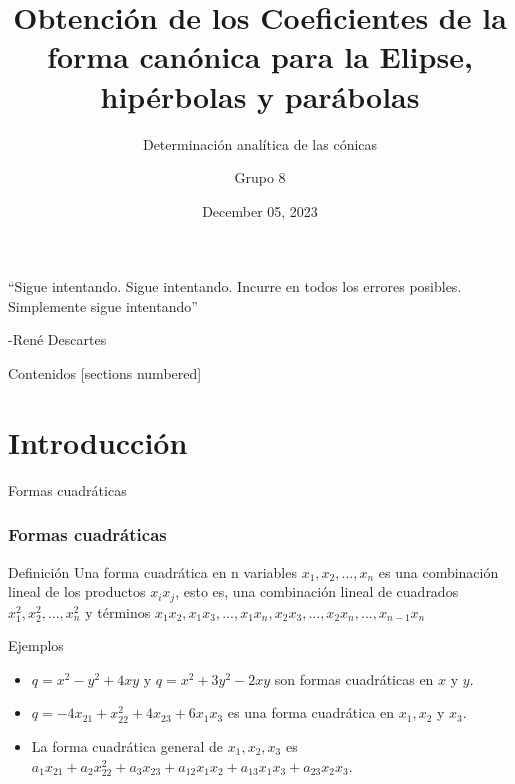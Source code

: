 \documentclass[xcolor={dvipsnames},aspectratio=169,10pt]{beamer}
\begin{document}
\title{Obtención de los Coeficientes de la forma canónica para la Elipse, hipérbolas y parábolas}
\subtitle{Determinación analítica de las cónicas}
\author{Grupo 8}
\date{December 05, 2023}

\maketitle%

\begin{frame}
\epigraph{``Sigue intentando. Sigue intentando. Incurre en todos los errores posibles. Simplemente sigue intentando''}{-René Descartes}
\end{frame}

\begin{frame}{Contenidos}
  [sections numbered]
  \tableofcontents[hideallsubsections]
\end{frame}

\section{Introducción}

\begin{frame}{Formas cuadráticas}
    \frametitle{Formas cuadráticas}
    \begin{block}{Definición}
      Una forma cuadrática en n variables $x_{1}, x_{2}, . . . , x_{n}$ es una combinación lineal de los
      productos $x_{i} x_{j}$, esto es, una combinación lineal de cuadrados $x_{1}^2 , x_{2}^2 , . . . , x_{n}^2$ y
      términos $x_{1}x_{2}, x_{1}x_{3}, . . . , x_{1}x_{n}, x_{2}x_{3}, . . . , x_{2}x_{n}, . . . , x_{n-1}x_{n}$
    \end{block}

  \begin{block}{Ejemplos}
    \begin{itemize}
        \item $q = x^2 - y^2 + 4xy$ y $q = x^2 + 3y^2 - 2xy$ son formas cuadráticas en $x$ y $y$.
        \item $q = -4x_{21} + x_{22}^2 + 4x_{23} + 6x_{1}x_{3}$ es una forma cuadrática en $x_{1}, x_{2}$ y $x_{3}$.
        \item La forma cuadrática general de $x_{1}, x_{2}, x_{3}$ es $a_{1}x_{21} + a_{2}x_{22}^2 + a_{3}x_{23} + a_{12}x_{1}x_{2} + a_{13}x_{1}x_{3} + a_{23}x_{2}x_{3}$.
    \end{itemize}
  \end{block}
\end{frame}
\end{document}
